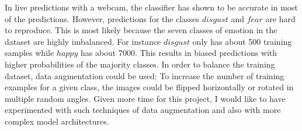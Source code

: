 \documentclass[twoside]{article}
\begin{document}
\begin{multicols}{2}
In live predictions with a webcam, the classifier has shown to be accurate in most of the predictions. However, predictions for the classes $disgust$ and $fear$ are hard to reproduce. This is most likely because the seven classes of emotion in the dataset are highly imbalanced. For instance $disgust$ only has about 500 training samples while $happy$ has about 7000. This results in biased predictions with higher probabilities of the majority classes. In order to balance the training dataset, data augmentation \cite{krizhevsky12} could be used: To increase the number of training examples for a given class, the images could be flipped horizontally or rotated in multiple random angles. Given more time for this project, I would like to have experimented with such techniques of data augmentation and also with more complex model architectures.









\end{multicols}
\end{document}
